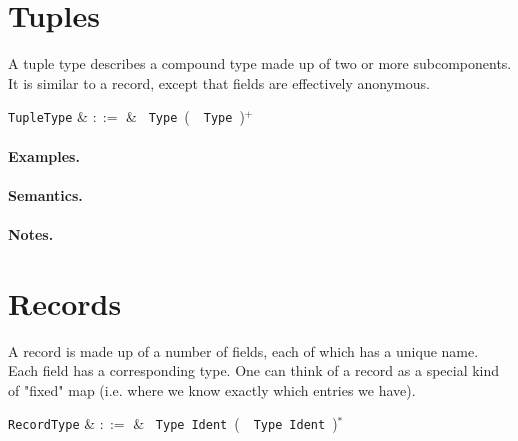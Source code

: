 
\section{Tuples}

A tuple type describes a compound type made up of two or more subcomponents. It is similar to a record, except that fields are effectively anonymous.

\begin{syntax}
  \verb+TupleType+ & $::=$ & \token{(}\ \verb+Type+\ \big(\ \token{,}\
  \verb+Type+\ \big)$^+$\ \token{)}\\
\end{syntax}

\paragraph{Examples.}

\paragraph{Semantics.}

\paragraph{Notes.}


\section{Records}

A record is made up of a number of fields, each of which has a unique name. Each field has a corresponding type. One can think of a record as a special kind of "fixed" map (i.e. where we know exactly which entries we have).

\begin{syntax}
  \verb+RecordType+ & $::=$ & \token{\{}\ \verb+Type+\
  \verb+Ident+\ \big(\ \token{,}\ \verb+Type+\ \verb+Ident+\
  \big)$^*$ \ \token{\}}\\
\end{syntax}

